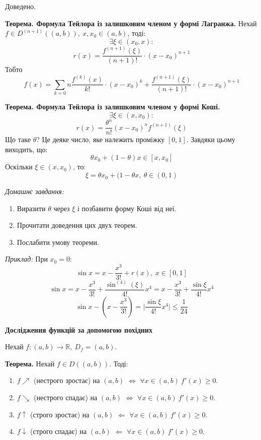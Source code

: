 \documentclass[12pt]{report}
\begin{document}
Доведено.

\vspace{3mm}

\textbf{Теорема. Формула Тейлора із залишковим членом у формі Лагранжа.}
Нехай $f \in D^{(n+1)}((a,b)),\ x,x_0 \in (a,b)$, тоді:
$$\exists \xi \in (x_0, x):$$
$$r(x) = \frac{f^({n+1})(\xi)}{(n+1)!}\cdot (x - x_0)^{n+1}$$
Тобто
$$f(x) = \sum_{k = 0}{n}\frac{f^{(k)}(x)}{k!} \cdot (x-x_0)^k + \frac{f^({n+1})(\xi)}{(n+1)!}\cdot (x - x_0)^{n+1}$$

\textbf{Теорема. Формула Тейлора із залишковим членом у формі Коші.}
$$\exists \xi \in (x, x_0):$$
$$r(x) = \frac{\theta^n}{n!}(x - x_0)^n f^{(n+1)}(\xi)$$
Що таке $\theta$? 
Це деяке число, яке належить проміжку $[0,1]$. Завдяки цьому виходить, що:
$$\theta x_0 + (1-\theta)x \in [x, x_0]$$
Оскільки $\xi \in (x, x_0)$, то:
$$\xi = \theta x_0 + (1 - \theta x,\ \theta \in (0,1)$$

\textit{Домашнє завдання:}
\begin{enumerate}
\item Виразити $\theta$ через $\xi$ і позбавити форму Коші від неї.
\item Прочитати доведення цих двух теорем.
\item Послабити умову теореми.
\end{enumerate}

\vspace{3mm}

\textit{Приклад:}
При $x_0 = 0$:
$$\sin x = x - \frac{x^3}{3!} + r(x),\ x \in [0,1]$$
$$\sin x = x - \frac{x^3}{3!} + \frac{\sin^{(4)} (\xi)}{4!} x^4 = x - \frac{x^3}{3!} + \frac{\sin \xi}{4!} x^4$$
$$\sin x - (x - \frac{x^3}{3!}) = \Big|\frac{\sin \xi}{4!} x^4\Big|\leq \frac{1}{24}$$

\begin{center}
\textbf{Дослідження функцій за допомогою похідних}
\end{center}

Нехай $f : (a,b) \to \mathbb{R},\ D_f = (a,b)$.

\textbf{Теорема.} Нехай $f \in D((a,b))$. Тоді:
\begin{enumerate}
\item $f \nearrow$ (нестрого зростає) на $(a,b)$ $\Longleftrightarrow$ $\forall x \in (a,b)\ f'(x) \geq 0$. 
\item $f \searrow$ (нестрого спадає) на $(a,b)$ $\Longleftrightarrow$ $\forall x \in (a,b)\ f'(x) \geq 0$.
\item $f \uparrow$ (строго зростає) на $(a,b)$ $\Longleftarrow$ $\forall x \in (a,b)\ f'(x) \geq 0$.
\item $f \downarrow$ (строго спадає) на $(a,b)$ $\Longleftarrow$ $\forall x \in (a,b)\ f'(x) \geq 0$.
\end{enumerate}
\end{document}
